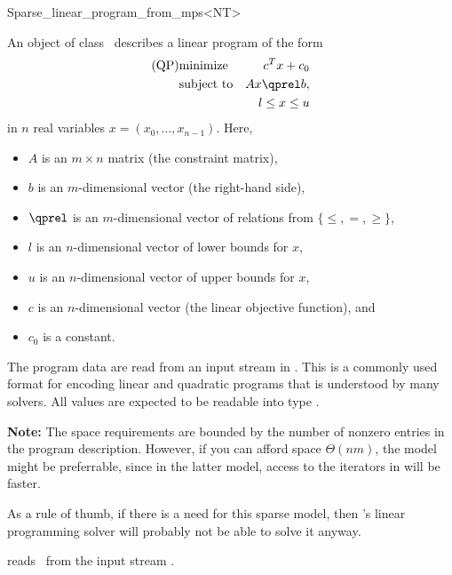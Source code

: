 \begin{ccRefClass}{Sparse_linear_program_from_mps<NT>}


\ccDefinition
An object of class \ccRefName\ describes a linear program of the form
\begin{eqnarray*}
\mbox{(QP)}& \mbox{minimize} & c^{T}x+c_0 \\
&\mbox{subject to}   & Ax\qprel b, \\
&                    & l \leq x \leq u
\end{eqnarray*}
in $n$ real variables $x=(x_0,\ldots,x_{n-1})$.
Here, 
\begin{itemize}
\item $A$ is an $m\times n$ matrix (the constraint matrix), 
\item $b$ is an $m$-dimensional vector (the right-hand side),
\item $\qprel$ is an $m$-dimensional vector of relations 
from $\{\leq, =, \geq\}$, 
\item $l$ is an $n$-dimensional vector of lower
bounds for $x$,
\item $u$ is an $n$-dimensional vector of upper bounds for
$x$, 
\item $c$ is an $n$-dimensional vector (the linear objective
  function), and 
\item $c_0$ is a constant.
\end{itemize}

The program data are read from an input stream in . This is
a commonly used format for encoding linear and quadratic programs that
is understood by many solvers. All values are expected to be readable
into type .

\textbf{Note:} 
The space requirements are bounded by the number of nonzero entries
in the program description. However, if you can afford space
$\Theta(nm)$, the model 
might be preferrable, since in the latter model, access to the 
iterators in  will be faster.

As a rule of thumb, if there is a need for this sparse model,
then \cgal's linear programming solver will probably not be able to 
solve it anyway.
\ccIsModel
{}

\ccCreation
\ccIndexClassCreation
{}

 {reads \ccVar\ from the input stream .}


\end{ccRefClass}
